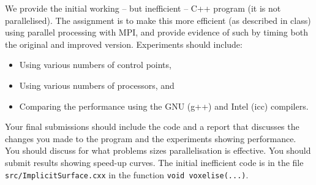 \documentclass[11pt,oneside,a4paper,final]{article}
\begin{document}
We provide the initial working -- but inefficient -- C++ program (it is not parallelised). 
The assignment is to make this more efficient (as described in class) using parallel processing with MPI, and provide
evidence of such by timing both the original and improved version. 
Experiments should include:
\begin{itemize}
\item Using various numbers of control points,
\item Using various numbers of processors, and 
\item Comparing the performance using the GNU (g++) and Intel (icc) compilers.
\end{itemize}

Your final submissions should include the code and a report that discusses the changes you made to the program and the experiments showing performance. 
You should discuss for what problems sizes parallelisation is effective. 
You should submit results showing speed-up curves. 
The initial inefficient code is in the file \verb!src/ImplicitSurface.cxx! in the function \verb!void voxelise(...)!. 

\vfill
\end{document}
